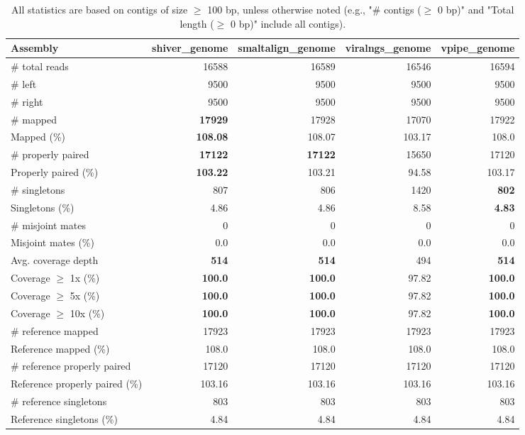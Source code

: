 \documentclass[12pt,a4paper]{article}
\begin{document}
\begin{table}[ht]
\begin{center}
\caption{All statistics are based on contigs of size $\geq$ 100 bp, unless otherwise noted (e.g., "\# contigs ($\geq$ 0 bp)" and "Total length ($\geq$ 0 bp)" include all contigs).}
\begin{tabular}{|l*{4}{|r}|}
\hline
Assembly & shiver\_genome & smaltalign\_genome & viralngs\_genome & vpipe\_genome \\ \hline
\# total reads & 16588 & 16589 & 16546 & 16594 \\ \hline
\# left & 9500 & 9500 & 9500 & 9500 \\ \hline
\# right & 9500 & 9500 & 9500 & 9500 \\ \hline
\# mapped & {\bf 17929} & 17928 & 17070 & 17922 \\ \hline
Mapped (\%) & {\bf 108.08} & 108.07 & 103.17 & 108.0 \\ \hline
\# properly paired & {\bf 17122} & {\bf 17122} & 15650 & 17120 \\ \hline
Properly paired (\%) & {\bf 103.22} & 103.21 & 94.58 & 103.17 \\ \hline
\# singletons & 807 & 806 & 1420 & {\bf 802} \\ \hline
Singletons (\%) & 4.86 & 4.86 & 8.58 & {\bf 4.83} \\ \hline
\# misjoint mates & 0 & 0 & 0 & 0 \\ \hline
Misjoint mates (\%) & 0.0 & 0.0 & 0.0 & 0.0 \\ \hline
Avg. coverage depth & {\bf 514} & {\bf 514} & 494 & {\bf 514} \\ \hline
Coverage $\geq$ 1x (\%) & {\bf 100.0} & {\bf 100.0} & 97.82 & {\bf 100.0} \\ \hline
Coverage $\geq$ 5x (\%) & {\bf 100.0} & {\bf 100.0} & 97.82 & {\bf 100.0} \\ \hline
Coverage $\geq$ 10x (\%) & {\bf 100.0} & {\bf 100.0} & 97.82 & {\bf 100.0} \\ \hline
\# reference mapped & 17923 & 17923 & 17923 & 17923 \\ \hline
Reference mapped (\%) & 108.0 & 108.0 & 108.0 & 108.0 \\ \hline
\# reference properly paired & 17120 & 17120 & 17120 & 17120 \\ \hline
Reference properly paired (\%) & 103.16 & 103.16 & 103.16 & 103.16 \\ \hline
\# reference singletons & 803 & 803 & 803 & 803 \\ \hline
Reference singletons (\%) & 4.84 & 4.84 & 4.84 & 4.84 \\ \hline

\end{tabular}
\end{center}
\end{table}
\end{document}
